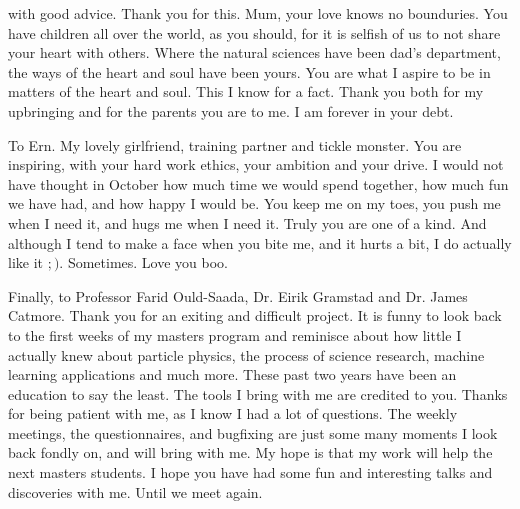 with good advice. Thank you for this. Mum, your love knows no bounduries. You have children all over the world, as you should, 
for it is selfish of us to not share your heart with others. Where the natural sciences have been dad's department, the ways 
of the heart and soul have been yours. You are what I aspire to be in matters of the heart and soul. This I know for a fact. 
Thank you both for my upbringing and for the parents you are to me. I am forever in your debt. \par 
To Ern. My lovely girlfriend, training partner and tickle monster. You are inspiring, with your hard work ethics, your ambition 
and your drive. I would not have thought in October how much time we would spend together, how much fun we have had, and how happy 
I would be. You keep me on my toes, you push me when I need it, and hugs me when I need it. Truly you are one of a kind. 
And although I tend to make a face when you bite me, and it hurts a bit, I do actually like it $;)$. Sometimes. Love you boo.\par
Finally, to Professor Farid Ould-Saada, Dr. Eirik Gramstad and Dr. James Catmore. Thank you for an exiting and difficult project. 
It is funny to look back to the first weeks of my masters program and reminisce about how little I actually knew about particle physics, 
the process of science research, machine learning applications and much more. These past two years have been an education 
to say the least. The tools I bring with me are credited to you. Thanks for being patient with me, as I know I had a lot of questions. 
The weekly meetings, the questionnaires, and bugfixing are just some many moments I look back fondly on, and will bring with me. 
My hope is that my work will help the next masters students. I hope you have had some fun and interesting talks 
and discoveries with me. Until we meet again. 
